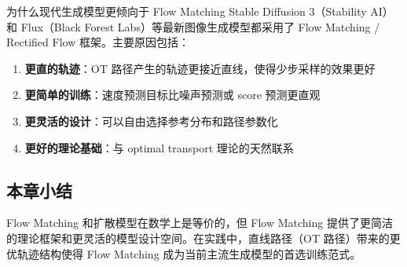 \begin{knowledgebox}{为什么现代生成模型更倾向于 Flow Matching}
Stable Diffusion 3（Stability AI）和 Flux（Black Forest Labs）等最新图像生成模型都采用了 Flow Matching / Rectified Flow 框架。主要原因包括：
\begin{enumerate}
    \item \textbf{更直的轨迹}：OT 路径产生的轨迹更接近直线，使得少步采样的效果更好
    \item \textbf{更简单的训练}：速度预测目标比噪声预测或 score 预测更直观
    \item \textbf{更灵活的设计}：可以自由选择参考分布和路径参数化
    \item \textbf{更好的理论基础}：与 optimal transport 理论的天然联系
\end{enumerate}
\end{knowledgebox}

\subsection{本章小结}

Flow Matching 和扩散模型在数学上是等价的，但 Flow Matching 提供了更简洁的理论框架和更灵活的模型设计空间。在实践中，直线路径（OT 路径）带来的更优轨迹结构使得 Flow Matching 成为当前主流生成模型的首选训练范式。


